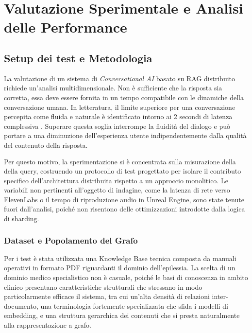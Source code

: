 \newpage\pagestyle{main}

\chapter{Valutazione Sperimentale e Analisi delle Performance}\label{chap:fifth}

\inlineminitoc

\section{Setup dei test e Metodologia}

La valutazione di un sistema di \textit{Conversational AI} basato su RAG distribuito richiede un'analisi multidimensionale. Non è sufficiente che la risposta sia corretta, essa deve essere fornita in un tempo compatibile con le dinamiche della conversazione umana. In letteratura, il limite superiore per una conversazione percepita come fluida e naturale è identificato intorno ai 2 secondi di latenza complessiva \cite{latency_eca}. Superare questa soglia interrompe la fluidità del dialogo e può portare a una diminuzione dell'esperienza utente indipendentemente dalla qualità del contenuto della risposta.

Per questo motivo, la sperimentazione si è concentrata sulla misurazione della della query, costruendo un protocollo di test progettato per isolare il contributo specifico dell'architettura distribuita rispetto a un approccio monolitico. Le variabili non pertinenti all'oggetto di indagine, come la latenza di rete verso ElevenLabs o il tempo di riproduzione audio in Unreal Engine, sono state tenute fuori dall'analisi, poiché non risentono delle ottimizzazioni introdotte dalla logica di sharding.

\subsection{Dataset e Popolamento del Grafo}

Per i test è stata utilizzata una Knowledge Base tecnica composta da manuali operativi in formato PDF riguardanti il dominio dell'epilessia. La scelta di un dominio medico specialistico non è casuale, poiché le basi di conoscenza in ambito clinico presentano caratteristiche strutturali che stressano in modo particolarmente efficace il sistema, tra cui un'alta densità di relazioni inter-documento, una terminologia fortemente specializzata che sfida i modelli di embedding, e una struttura gerarchica dei contenuti che si presta naturalmente alla rappresentazione a grafo.

